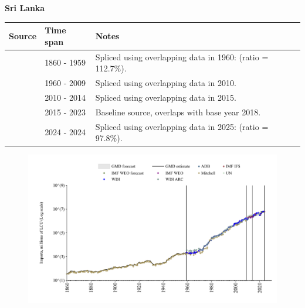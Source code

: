 \documentclass[12pt,a4paper,landscape]{article}
\begin{document}
\begin{adjustbox}{max totalsize={\paperwidth}{\paperheight},center}
\begin{minipage}[t][\textheight][t]{\textwidth}
\vspace*{0.5cm}
{}
\begin{center}
{\Large\bfseries Sri Lanka}
\end{center}
\vspace{0.5cm}
\begin{table}[H]
\centering
\small
\begin{tabular}{|l|l|l|}
\hline
\textbf{Source} & \textbf{Time span} & \textbf{Notes} \\
\hline
\rowcolor{white}\cite{Mitchell}& 1860 - 1959 &Spliced using overlapping data in 1960: (ratio = 112.7\%).\\
\rowcolor{lightgray}\cite{WDI}& 1960 - 2009 &Spliced using overlapping data in 2010.\\
\rowcolor{white}\cite{UN}& 2010 - 2014 &Spliced using overlapping data in 2015.\\
\rowcolor{lightgray}\cite{WDI}& 2015 - 2023 &Baseline source, overlaps with base year 2018.\\
\rowcolor{white}\cite{IMF_IFS}& 2024 - 2024 &Spliced using overlapping data in 2025: (ratio = 97.8\%).\\
\hline
\end{tabular}
\end{table}
\begin{figure}[H]
\centering
\includegraphics[width=\textwidth,height=0.6\textheight,keepaspectratio]{graphs/LKA_imports.pdf}
\end{figure}
\end{minipage}
\end{adjustbox}
\end{document}
